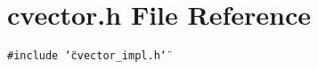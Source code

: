 \section{cvector.h File Reference}
\label{cvector_8h}
{\tt \#include \char`\"{}cvector\_\-impl.h\char`\"{}}\par
